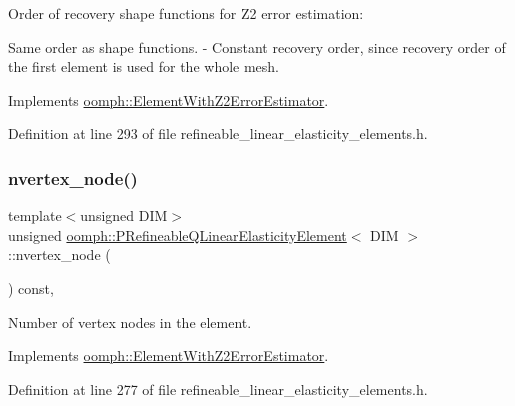 Order of recovery shape functions for Z2 error estimation\+: 


\begin{DoxyItemize}
\item Same order as shape functions. -\/ Constant recovery order, since recovery order of the first element is used for the whole mesh. 
\end{DoxyItemize}

Implements \hyperlink{classoomph_1_1ElementWithZ2ErrorEstimator_af39480835bd3e0f6b2f4f7a9a4044798}{oomph\+::\+Element\+With\+Z2\+Error\+Estimator}.



Definition at line 293 of file refineable\+\_\+linear\+\_\+elasticity\+\_\+elements.\+h.

\mbox{\label{classoomph_1_1PRefineableQLinearElasticityElement_a1c3378ffd265b23eb9702a600742782b}} 
\subsubsection{\texorpdfstring{nvertex\+\_\+node()}{nvertex\_node()}}
{\footnotesize\ttfamily template$<$unsigned D\+IM$>$ \\
unsigned \hyperlink{classoomph_1_1PRefineableQLinearElasticityElement}{oomph\+::\+P\+Refineable\+Q\+Linear\+Elasticity\+Element}$<$ D\+IM $>$\+::nvertex\+\_\+node (\begin{DoxyParamCaption}{ }\end{DoxyParamCaption}) const\hspace{0.3cm}{\ttfamily [inline]}, {\ttfamily [virtual]}}



Number of vertex nodes in the element. 



Implements \hyperlink{classoomph_1_1ElementWithZ2ErrorEstimator_a19495a0e77ef4ff35f15fdf7913b4077}{oomph\+::\+Element\+With\+Z2\+Error\+Estimator}.



Definition at line 277 of file refineable\+\_\+linear\+\_\+elasticity\+\_\+elements.\+h.



